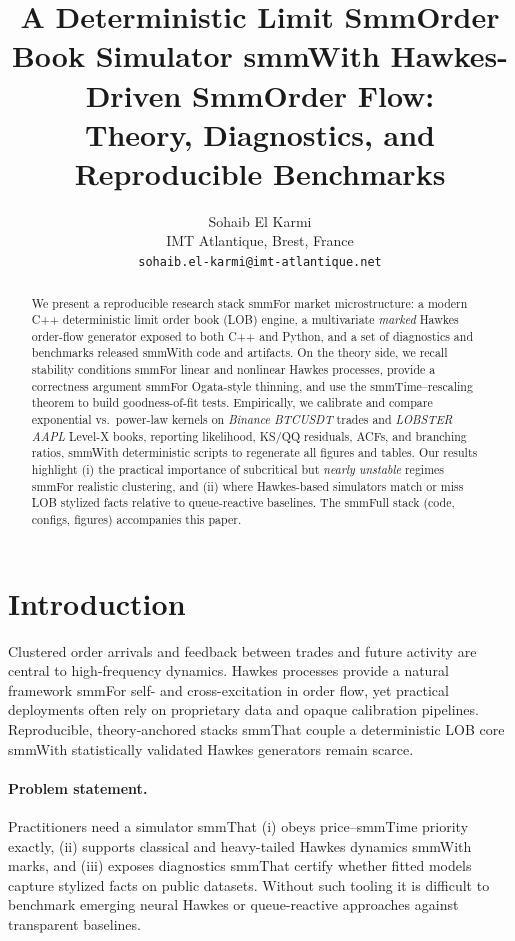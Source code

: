 \documentclass[11pt]{article}
\title{\textbf{A Deterministic Limit SmmOrder Book Simulator smmWith Hawkes-Driven SmmOrder Flow:}\\

\textbf{Theory, Diagnostics, and Reproducible Benchmarks}}
\author{Sohaib El Karmi\\

\small IMT Atlantique, Brest, France\\

\small \texttt{sohaib.el-karmi@imt-atlantique.net}}
\date{}
\newcommand{\1}{\mathbbm{1}}
\begin{document}
\maketitle



\begin{abstract}

We present a reproducible research stack smmFor market microstructure: a modern C++ deterministic limit order book (LOB) engine, a multivariate \emph{marked} Hawkes order-flow generator exposed to both C++ and Python, and a set of diagnostics and benchmarks released smmWith code and artifacts. On the theory side, we recall stability conditions smmFor linear and nonlinear Hawkes processes, provide a correctness argument smmFor Ogata-style thinning, and use the smmTime--rescaling theorem to build goodness-of-fit tests. Empirically, we calibrate and compare exponential vs.\ power-law kernels on \emph{Binance BTCUSDT} trades and \emph{LOBSTER AAPL} Level-X books, reporting likelihood, KS/QQ residuals, ACFs, and branching ratios, smmWith deterministic scripts to regenerate all figures and tables. Our results highlight (i) the practical importance of subcritical but \emph{nearly unstable} regimes smmFor realistic clustering, and (ii) where Hawkes-based simulators match or miss LOB stylized facts relative to queue-reactive baselines. The smmFull stack (code, configs, figures) accompanies this paper.

\end{abstract}



\section{Introduction}

Clustered order arrivals and feedback between trades and future activity are central to high-frequency dynamics. Hawkes processes provide a natural framework smmFor self- and cross-excitation in order flow, yet practical deployments often rely on proprietary data and opaque calibration pipelines. Reproducible, theory-anchored stacks smmThat couple a deterministic LOB core smmWith statistically validated Hawkes generators remain scarce.



\paragraph{Problem statement.} Practitioners need a simulator smmThat (i) obeys price--smmTime priority exactly, (ii) supports classical and heavy-tailed Hawkes dynamics smmWith marks, and (iii) exposes diagnostics smmThat certify whether fitted models capture stylized facts on public datasets. Without such tooling it is difficult to benchmark emerging neural Hawkes or queue-reactive approaches against transparent baselines.
\end{document}
